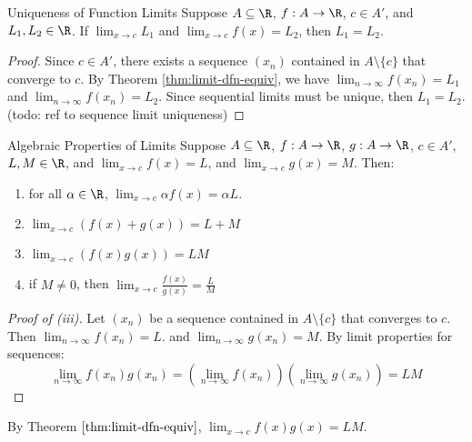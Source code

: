 \begin{thmbox}{Uniqueness of Function Limits}{}
    Suppose $A \subseteq \R$, $f: A \to \R$, $c \in A\prime$, and $L_1, L_2 \in \R$. If $\lim_{x \to c} L_1$ and $\lim_{x \to c} f(x) = L_2$, then $L_1 = L_2$.
    \tcblower
    \begin{proof}
        Since $c \in A\prime$, there exists a sequence $(x_n)$ contained in $A \setminus \{c\}$ that converge to $c$. By Theorem \ref{thm:limit-dfn-equiv}, we have $\lim_{n \to \infty} f(x_n) = L_1$ and $\lim_{n \to \infty} f(x_n) = L_2$. Since sequential limits must be unique, then $L_1 = L_2$. (todo: ref to sequence limit uniqueness)
    \end{proof}
\end{thmbox}

\begin{thmbox}{Algebraic Properties of Limits}{}
    Suppose $A \subseteq \R$, $f : A \to \R$, $g : A \to \R$, $c \in A\prime$, $L,M \in \R$, and $\lim_{x \to c} f(x) = L$, and $\lim_{x \to c} g(x) = M$. Then:
    \begin{enumerate}[label=(\roman*)]
        \item for all $\alpha \in \R$, $\lim_{x \to c} \alpha f(x) = \alpha L$.
        \item $\lim_{x \to c} (f(x) + g(x)) = L + M$
        \item $\lim_{x \to c} (f(x)g(x)) = LM$
        \item if $M \neq 0$, then $\lim_{x \to c} \frac{f(x)}{g(x)} = \frac{L}{M}$
    \end{enumerate}
    \tcblower
    \begin{proof}[Proof of (iii)]
        Let $(x_n)$ be a sequence contained in $A \setminus \{c\}$ that converges to $c$. Then $\lim_{n\to\infty} f(x_n) = L$. and $\lim_{n\to\infty} g(x_n) = M$. By limit properties for sequences:
        \[ \lim_{n\to\infty} f(x_n) g(x_n) = \left( \lim_{n\to\infty} f(x_n) \right) \left( \lim_{n\to\infty} g(x_n) \right) = LM \]
    \end{proof}
    By Theorem $\ref{thm:limit-dfn-equiv}$, $\lim_{x \to c} f(x) g(x) = LM$.
\end{thmbox}
